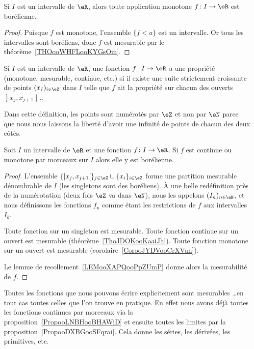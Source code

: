 \begin{corollary}       \label{CorooJYDVooCrXVun}
	Si \( I\) est un intervalle de \( \eR\), alors toute application monotone \( f\colon I\to \eR\) est borélienne.
\end{corollary}

\begin{proof}
	Puisque \( f\) est monotone, l'ensemble \( \{ f<a \}\) est un intervalle. Or tous les intervalles sont boréliens, donc \( f\) est mesurable par le théorème~\ref{THOooWHFLooKYGsOm}.
\end{proof}

\begin{definition}
	Si \( I\) est un intervalle de \( \eR\), une fonction \( f\colon I\to \eR\) a une propriété (monotone, mesurable, continue, etc.)  si il existe une suite strictement croissante de points \( (x_I)_{i\in \eZ}\) dans \( I\) telle que \( f\) ait la propriété sur chacun des ouverts \( \mathopen] x_j ,x_{j+1} \mathclose[.\).
\end{definition}
Dans cette définition, les points sont numérotés par \( \eZ\) et non par \( \eN\) parce que nous nous laissons la liberté d'avoir une infinité de points de chacun des deux côtés.

\begin{proposition}     \label{PropooLNBHooBHAWiD}
	Soit \( I\) un intervalle de \( \eR\) et une fonction \( f\colon I\to \eR\). Si \( f\) est continue ou monotone par morceaux sur \( I\) alors elle y est borélienne.
\end{proposition}

\begin{proof}
	L'ensemble \( \{  \mathopen] x_j , x_{j+1} \mathclose[  \}_{j\in \eZ}\cup\{ x_i \}_{i\in \eZ}\) forme une partition mesurable dénombrable de \( I\) (les singletons sont des boréliens). À une belle redéfinition près de la numérotation (deux fois \( \eZ\) va dans \( \eN\)), nous les appelons \( (I_n)_{n\in \eN}\), et nous définissons les fonctions \( f_n\) comme étant les restrictions de \( f\) aux intervalles \( I_k\).

	Toute fonction sur un singleton est mesurable. Toute fonction continue sur un ouvert est mesurable (théorème~\ref{ThoJDOKooKaaiJh}). Toute fonction monotone sur un ouvert est mesurable (corolaire~\ref{CorooJYDVooCrXVun}).

	Le lemme de recollement~\ref{LEMooXAPQooPpZUmP} donne alors la mesurabilité de \( f\).
\end{proof}

\begin{normaltext}
	Toutes les fonctions que nous pouvons écrire explicitement sont mesurables \ldots en tout cas toutes celles que l'on trouve en pratique. En effet nous avons déjà toutes les fonctions continues par morceaux via la proposition~\ref{PropooLNBHooBHAWiD} et ensuite toutes les limites par la proposition~\ref{PropooDXBGooSFqrai}. Cela donne les séries, les dérivées, les primitives, etc.
\end{normaltext}
